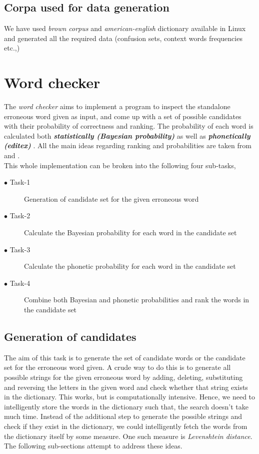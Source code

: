 \documentclass{article}
\begin{document}
		\subsection{Corpa used for data generation}
			We have used \textit{brown corpus} and \textit{american-english} dictionary available in Linux and generated all the required data (confusion sets, context words frequencies etc.,)
			
	\section{Word checker}
		The \textit{word checker} aims to implement a program to inspect the standalone erroneous word given as input, and come up with a set of possible candidates with their probability of correctness and ranking. The probability of each word is calculated both \textbf{\textit{statistically (Bayesian probability)}} \cite{bayesian} as well as \textbf{\textit{phonetically (editex)}} \cite{phonetic}. All the main ideas regarding ranking and probabilities are taken from \cite{bayesian} and \cite{phonetic}.\\
		This whole implementation can be broken into the following four sub-tasks,
		\begin{description}
			\item[$\bullet$ Task-1] Generation of candidate set for the given erroneous word
			\item[$\bullet$ Task-2] Calculate the Bayesian probability for each word in the candidate set
			\item[$\bullet$ Task-3] Calculate the phonetic probability for each word in the candidate set
			\item[$\bullet$ Task-4] Combine both Bayesian and phonetic probabilities and rank the words in the candidate set
		\end{description}
		
		\subsection{Generation of candidates}
			The aim of this task is to generate the set of candidate words or the candidate set for the erroneous word given. A crude way to do this is to generate all possible strings for the given erroneous word by adding, deleting, substituting and reversing the letters in the given word and check whether that string exists in the dictionary. This works, but is computationally intensive. Hence, we need to intelligently store the words in the dictionary such that, the search doesn't take much time. Instead of the additional step to generate the possible strings and check if they exist in the dictionary, we could intelligently fetch the words from the dictionary itself by some measure. One such measure is \textit{Levenshtein distance}. The following sub-sections attempt to address these ideas. 
\end{document}
